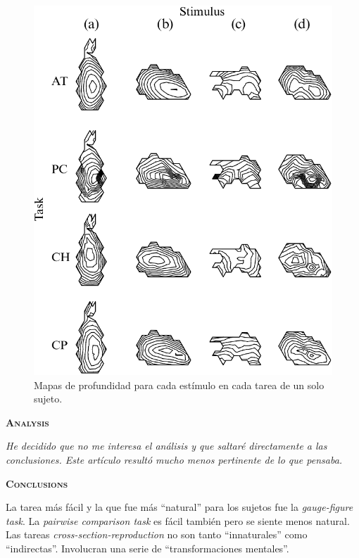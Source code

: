 \documentclass[a4paper,12pt]{article}
\begin{document}
\begin{figure}[ht]
	\begin{center}
		\includegraphics[scale=0.3]{Koenderick2001(4).png}
		\caption{Mapas de profundidad para cada estímulo en cada tarea de un solo sujeto.}
	\end{center}
\end{figure}

{\scshape\bfseries Analysis}

{\itshape He decidido que no me interesa el análisis y que saltaré directamente a las conclusiones. Este artículo resultó mucho menos pertinente de lo que pensaba.}

{\scshape\bfseries Conclusions}

La tarea más fácil y la que fue más ``natural'' para los sujetos fue la {\itshape gauge-figure task}. La {\itshape pairwise comparison task} es fácil también pero se siente menos natural. Las tareas {\itshape cross-section-reproduction} no son tanto ``innaturales'' como ``indirectas''. Involucran una serie de ``transformaciones mentales''.
\end{document}
